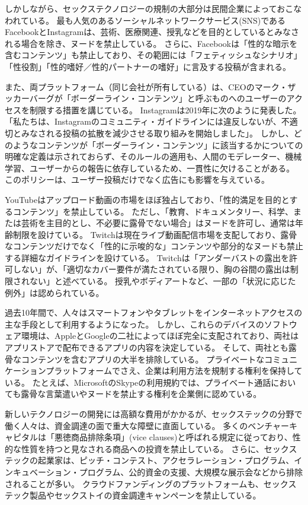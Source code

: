 \documentclass[paper=a4,book,openany]{jlreq}
\begin{document}
しかしながら、セックステクノロジーの規制の大部分は民間企業によっておこなわれている。
最も人気のあるソーシャルネットワークサービス(SNS)であるFacebookとInstagramは、芸術、医療関連、授乳などを目的としているとみなされる場合を除き、ヌードを禁止している。
さらに、Facebookは「性的な暗示を含むコンテンツ」も禁止しており、その範囲には「フェティッシュなシナリオ」「性役割」「性的嗜好／性的パートナーの嗜好」に言及する投稿が含まれる。

また、両プラットフォーム（同じ会社が所有している）は、CEOのマーク・ザッカーバーグが「ボーダーライン・コンテンツ」と呼ぶものへのユーザーのアクセスを制限する措置を講じている。
Instagramは2019年に次のように発表した。
「私たちは、Instagramのコミュニティ・ガイドラインには違反しないが、不適切とみなされる投稿の拡散を減少させる取り組みを開始しました」\citep{constine19:_instag_now_demot_vaguel_inapp_conten}。
しかし、どのようなコンテンツが「ボーダーライン・コンテンツ」に該当するかについての明確な定義は示されておらず、そのルールの適用も、人間のモデレーター、機械学習、ユーザーからの報告に依存しているため、一貫性に欠けることがある。
このポリシーは、ユーザー投稿だけでなく広告にも影響を与えている\citep{kibbe20:_faceb_has_banned_ads_kink}。

YouTubeはアップロード動画の市場をほぼ独占しており、「性的満足を目的とするコンテンツ」を禁止している。
ただし、「教育、ドキュメンタリー、科学、または芸術を主目的とし、不必要に露骨でない場合」はヌードを許可し、通常は年齢制限を設けている。
Twitchは現在ライブ動画配信市場を支配しており、露骨なコンテンツだけでなく「性的に示唆的な」コンテンツや部分的なヌードも禁止する詳細なガイドラインを設けている。
Twitchは「アンダーバストの露出を許可しない」が、「適切なカバー要件が満たされている限り、胸の谷間の露出は制限されない」と述べている。
授乳やボディアートなど、一部の「状況に応じた例外」は認められている\citep{good20:_twitc_has_new_nudit_rules_theyr_detail}。

過去10年間で、人々はスマートフォンやタブレットをインターネットアクセスの主な手段として利用するようになった。
しかし、これらのデバイスのソフトウェア環境は、AppleとGoogleの二社によってほぼ完全に支配されており、両社はアプリストアで配布できるアプリの内容を決定している。
そして、両社とも露骨なコンテンツを含むアプリの大半を排除している。
プライベートなコミュニケーションプラットフォームでさえ、企業は利用方法を規制する権利を保持している。
たとえば、MicrosoftのSkypeの利用規約では、プライベート通話においても露骨な言葉遣いやヌードを禁止する権利を企業側に認めている\citep{smith18:_micros_ban_offen_languag_skype}。

新しいテクノロジーの開発には高額な費用がかかるが、セックステックの分野で働く人々は、資金調達の面で重大な障壁に直面している。
多くのベンチャーキャピタルは「{悪徳商品排除条項}」(vice clauses)と呼ばれる規定に従っており、性的な性質を持つと見なされる商品への投資を禁止している\citep{davis19:_compan_ventur_capit_isnt_allow_inves_in}。
さらに、セックステックの起業家は、ピッチ・コンテスト、アクセラレーション・プログラム、インキュベーション・プログラム、公的資金の支援、大規模な展示会などから排除されることが多い\citep{fox19:_vibrat_center_tech_sexis_contr}。
クラウドファンディングのプラットフォームも、セックステック製品やセックストイの資金調達キャンペーンを禁止している\citep{manning17:_sextec_revol_will_not_be_crowd}。
\end{document}
